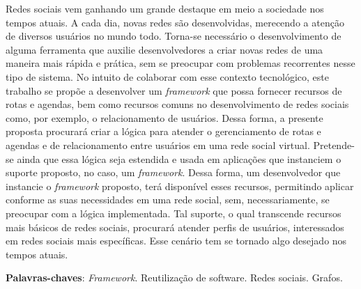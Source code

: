 \begin{resumo}

Redes sociais vem ganhando um grande destaque em meio a sociedade nos tempos atuais. A cada dia, novas redes são desenvolvidas, merecendo a atenção de diversos usuários no mundo todo. Torna-se necessário o desenvolvimento de alguma ferramenta que auxilie desenvolvedores a criar novas redes de uma maneira mais rápida e prática, sem se preocupar com problemas recorrentes nesse tipo de sistema. No intuito de colaborar com esse contexto tecnológico, este trabalho se propõe a desenvolver um \textit{framework} que possa fornecer recursos de rotas e agendas, bem como recursos comuns no desenvolvimento de redes sociais como, por exemplo, o relacionamento de usuários. Dessa forma, a presente proposta procurará criar a lógica para atender o gerenciamento de rotas e agendas e de relacionamento entre usuários em uma rede social virtual. Pretende-se ainda que essa lógica seja estendida e usada em aplicações que instanciem o suporte proposto, no caso, um \textit{framework}. Dessa forma, um desenvolvedor que instancie o \textit{framework} proposto, terá disponível esses recursos, permitindo aplicar conforme as suas necessidades em uma rede social, sem, necessariamente, se preocupar com a lógica implementada. Tal suporte, o qual transcende recursos mais básicos de redes sociais, procurará atender perfis de usuários, interessados em redes sociais mais específicas. Esse cenário tem se tornado algo desejado nos tempos atuais.

 \vspace{\onelineskip}
    
 \noindent
 \textbf{Palavras-chaves}: \textit{Framework}. Reutilização de software. Redes sociais. Grafos.
\end{resumo}
